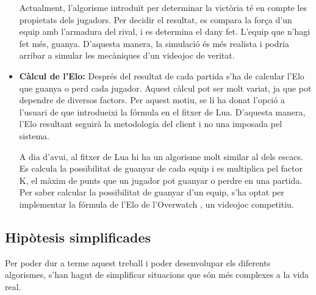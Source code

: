 \documentclass[a4paper]{article}
\begin{document}
\begin{itemize}
    Actualment, l'algorisme introduït per determinar la victòria té en compte les propietats dels jugadors. Per decidir el resultat, es compara la força d'un equip amb l'armadura del rival, i es determina el dany fet. L'equip que n'hagi fet més, guanya. D'aquesta manera, la simulació és més realista i podria arribar a simular les mecàniques d'un videojoc de veritat.

    \item \textbf{Càlcul de l'Elo:} Després del resultat de cada partida s'ha de calcular l'Elo que guanya o perd cada jugador. Aquest càlcul pot ser molt variat, ja que pot dependre de diversos factors. Per aquest motiu, se li ha donat l'opció a l'usuari de que introdueixi la fórmula en el fitxer de Lua. D'aquesta manera, l'Elo resultant seguirà la metodologia del client i no una imposada pel sistema. 
    
    A dia d'avui, al fitxer de Lua hi ha un algorisme molt similar al dels escacs. Es calcula la possibilitat de guanyar de cada equip i es multiplica pel factor K, el màxim de punts que un jugador pot guanyar o perdre en una partida. Per saber calcular la possibilitat de guanyar d'un equip, s'ha optat per implementar la fórmula de l'Elo de l'Overwatch \cite{overwatchElo}, un videojoc competitiu.
\end{itemize}

\newpage

\subsection{Hipòtesis simplificades}
Per poder dur a terme aquest treball i poder desenvolupar els diferents algorismes, s'han hagut de simplificar situacions que són més complexes a la vida real.
\end{document}
